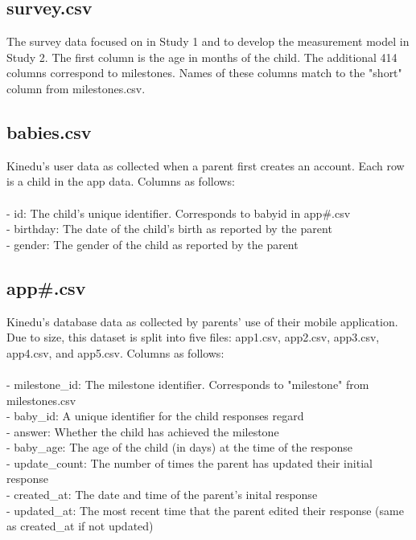 \documentclass[man]{apa7}
\begin{document}
\subsection*{survey.csv}

The survey data focused on in Study 1 and to develop the measurement model in Study 2. The first column is the age in months of the child. The additional 414 columns correspond to milestones. Names of these columns match to the "short" column from milestones.csv.

\subsection*{babies.csv}

Kinedu's user data as collected when a parent first creates an account. Each row is a child in the app data. Columns as follows: \\\\
- id: The child's unique identifier. Corresponds to babyid in app#.csv \\
- birthday: The date of the child's birth as reported by the parent \\
- gender: The gender of the child as reported by the parent

\subsection*{app#.csv}

Kinedu's database data as collected by parents' use of their mobile application. Due to size, this dataset is split into five files: app1.csv, app2.csv, app3.csv, app4.csv, and app5.csv. Columns as follows: \\\\
- milestone\_id: The milestone identifier. Corresponds to "milestone" from milestones.csv \\
- baby\_id: A unique identifier for the child responses regard \\
- answer: Whether the child has achieved the milestone \\
- baby\_age: The age of the child (in days) at the time of the response \\
- update\_count: The number of times the parent has updated their initial response \\
- created\_at: The date and time of the parent's inital response \\
- updated\_at: The most recent time that the parent edited their response (same as created\_at if not updated)
\end{document}
